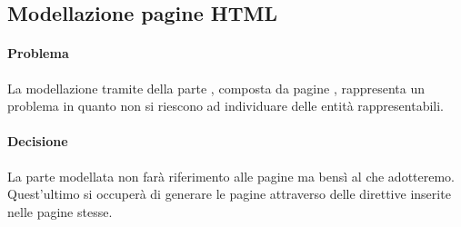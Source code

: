 \subsection{Modellazione pagine HTML}
\paragraph{Problema} La modellazione tramite  della parte , composta da pagine , rappresenta un problema in quanto non si riescono ad individuare delle entità rappresentabili.
\paragraph{Decisione} La parte  modellata non farà riferimento alle pagine  ma bensì al  che adotteremo.
Quest'ultimo si occuperà di generare le pagine attraverso delle direttive inserite nelle pagine  stesse.
